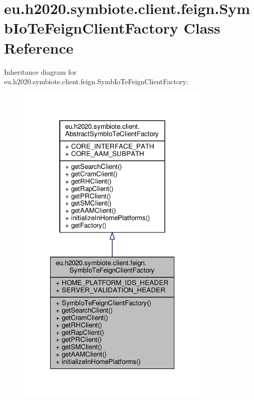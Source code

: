 \hypertarget{classeu_1_1h2020_1_1symbiote_1_1client_1_1feign_1_1SymbIoTeFeignClientFactory}{}\section{eu.\+h2020.\+symbiote.\+client.\+feign.\+Symb\+Io\+Te\+Feign\+Client\+Factory Class Reference}
\label{classeu_1_1h2020_1_1symbiote_1_1client_1_1feign_1_1SymbIoTeFeignClientFactory}


Inheritance diagram for eu.\+h2020.\+symbiote.\+client.\+feign.\+Symb\+Io\+Te\+Feign\+Client\+Factory\+:\nopagebreak
\begin{figure}[H]
\begin{center}
\leavevmode
\includegraphics[width=264pt]{classeu_1_1h2020_1_1symbiote_1_1client_1_1feign_1_1SymbIoTeFeignClientFactory__inherit__graph}
\end{center}
\end{figure}


